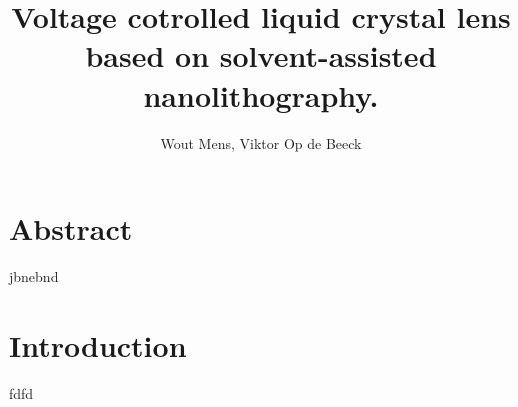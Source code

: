 \documentclass[a4paper]{article}
\title{Voltage cotrolled liquid crystal lens based on solvent-assisted nanolithography.}
\author{Wout Mens, Viktor Op de Beeck}
\begin{document}
\maketitle
\section{Abstract}
jbnebnd

\section{Introduction}
fdfd
\end{document}
